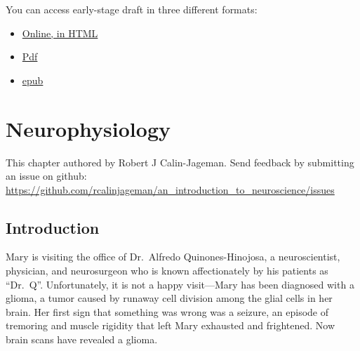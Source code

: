 \documentclass[
]{book}
\begin{document}
You can access early-stage draft in three different formats:

\begin{itemize}
\item
  \href{https://rcalinjageman.github.io/an_introduction_to_neuroscience/}{Online, in HTML}
\item
  \href{https://github.com/rcalinjageman/an_introduction_to_neuroscience/raw/main/docs/Intro_to_Neuroscience.pdf}{Pdf}
\item
  \href{https://github.com/rcalinjageman/an_introduction_to_neuroscience/raw/main/docs/Intro_to_Neuroscience.epub}{epub}
\end{itemize}

\hypertarget{neurophysiology}{%
\chapter{Neurophysiology}\label{neurophysiology}}

This chapter authored by Robert J Calin-Jageman. Send feedback by submitting an issue on github: \url{https://github.com/rcalinjageman/an_introduction_to_neuroscience/issues}

\hypertarget{neurophysiology-introduction}{%
\section{Introduction}\label{neurophysiology-introduction}}

Mary is visiting the office of Dr.~Alfredo Quinones-Hinojosa, a neuroscientist, physician, and neurosurgeon who is known affectionately by his patients as ``Dr.~Q''. Unfortunately, it is not a happy visit---Mary has been diagnosed with a glioma, a tumor caused by runaway cell division among the glial cells in her brain. Her first sign that something was wrong was a seizure, an episode of tremoring and muscle rigidity that left Mary exhausted and frightened. Now brain scans have revealed a glioma.
\end{document}
